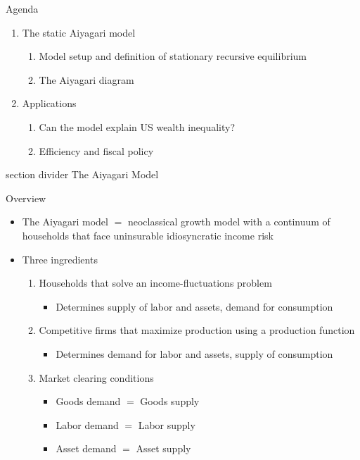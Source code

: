 \documentclass[9pt]{beamer}
\newcommand{\sectiondivider}[1]{
	\begin{frame}[plain]
		\vfill
		\begin{beamercolorbox}[wd=.84\textwidth,sep=1.1em,center,rounded=true]{section divider}
			{\usebeamerfont{section title} #1}
		\end{beamercolorbox}
		\vfill
	\end{frame}
}
\newcommand{\bit}{\begin{itemize}}
\newcommand{\eit}{\end{itemize}}
\newcommand{\ben}{\begin{enumerate}}
\newcommand{\een}{\end{enumerate}}
\begin{document}
\begin{frame}{Agenda}

\ben
\setlength\itemsep{2em}

\item The static Aiyagari model
\ben
	\item Model setup and definition of stationary recursive equilibrium
	\item The Aiyagari diagram
\een

\item Applications
\ben
	\item Can the model explain US wealth inequality?
\item Efficiency and fiscal policy
\een



\een

\end{frame}


\sectiondivider{The Aiyagari Model}


\begin{frame}{Overview}

\bit
	\setlength\itemsep{2em}
\item The Aiyagari model $=$ neoclassical growth model with a continuum of households that face uninsurable idiosyncratic income risk 
	
	\item Three ingredients

\ben
\setlength\itemsep{1.5em}

\item Households that solve an income-fluctuations problem
\bit
	\item Determines supply of labor and assets, demand for consumption
\eit

\item Competitive firms that maximize production using a production function
\bit
	\item Determines demand for labor and assets, supply of consumption
\eit

\item Market clearing conditions
\bit
	\setlength\itemsep{0.5em}
	\item Goods demand $=$ Goods supply
	\item Labor demand $=$ Labor supply
	\item Asset demand $=$ Asset supply
\eit

\een
\eit


\end{frame}
\end{document}
